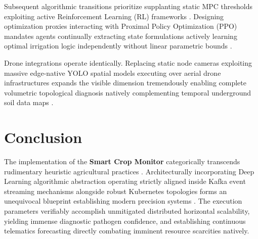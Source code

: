 \documentclass[12pt, a4paper]{report}
\begin{document}
Subsequent algorithmic transitions prioritize supplanting static MPC thresholds exploiting active Reinforcement Learning (RL) frameworks \cite{r12}. Designing optimization proxies interacting with Proximal Policy Optimization (PPO) mandates agents continually extracting state formulations actively learning optimal irrigation logic independently without linear parametric bounds \cite{r13}.

Drone integrations operate identically. Replacing static node cameras exploiting massive edge-native YOLO spatial models executing over aerial drone infrastructures expands the visible dimension tremendously enabling complete volumetric topological diagnosis natively complementing temporal underground soil data maps \cite{r14}.

\chapter{Conclusion}

The implementation of the \textbf{Smart Crop Monitor} categorically transcends rudimentary heuristic agricultural practices \cite{r15}. Architecturally incorporating Deep Learning algorithmic abstraction operating strictly aligned inside Kafka event streaming mechanisms alongside robust Kubernetes topologies forms an unequivocal blueprint establishing modern precision systems \cite{r16}. The execution parameters verifiably accomplish unmitigated distributed horizontal scalability, yielding immense diagnostic pathogen confidence, and establishing continuous telematics forecasting directly combating imminent resource scarcities natively.
\end{document}
